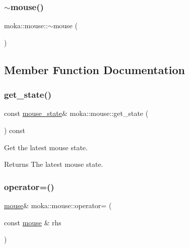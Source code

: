 \mbox{\label{classmoka_1_1mouse_a0bd250ae71a723879ee92f3bd5a20679}} 
\subsubsection{\texorpdfstring{$\sim$mouse()}{~mouse()}}
{\footnotesize\ttfamily moka\+::mouse\+::$\sim$mouse (\begin{DoxyParamCaption}{ }\end{DoxyParamCaption})\hspace{0.3cm}{\ttfamily [default]}}



\subsection{Member Function Documentation}
\mbox{\label{classmoka_1_1mouse_a84b5c0f69d38f4cecbdb83ee79bded51}} 
\subsubsection{\texorpdfstring{get\_state()}{get\_state()}}
{\footnotesize\ttfamily const \mbox{\hyperlink{classmoka_1_1mouse__state}{mouse\+\_\+state}}\& moka\+::mouse\+::get\+\_\+state (\begin{DoxyParamCaption}{ }\end{DoxyParamCaption}) const}



Get the latest mouse state. 

\begin{DoxyReturn}{Returns}
The latest mouse state. 
\end{DoxyReturn}
\mbox{\label{classmoka_1_1mouse_a500f0cd4e101507fe975b63473483bc2}} 
\subsubsection{\texorpdfstring{operator=()}{operator=()}\hspace{0.1cm}{\footnotesize\ttfamily [1/2]}}
{\footnotesize\ttfamily \mbox{\hyperlink{classmoka_1_1mouse}{mouse}}\& moka\+::mouse\+::operator= (\begin{DoxyParamCaption}\item[{const \mbox{\hyperlink{classmoka_1_1mouse}{mouse}} \&}]{rhs }\end{DoxyParamCaption})\hspace{0.3cm}{\ttfamily [delete]}}

